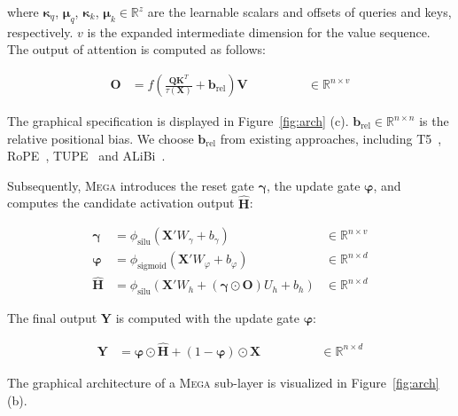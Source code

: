 where $\boldsymbol{\kappa}_q$, $\boldsymbol{\mu}_q$, $\boldsymbol{\kappa}_k$, $\boldsymbol{\mu}_k \in \mathbb{R}^{z}$ are the learnable scalars and offsets of queries and keys, respectively. $v$ is the expanded intermediate dimension for the value sequence. The output of attention is computed as follows:

\begin{align}\label{eq:attention2}
\boldsymbol{O} & = f \left(\frac{\boldsymbol{Q}{\boldsymbol{K}}^{T}}{\tau(\boldsymbol{X})} + \boldsymbol{b}_{\mathrm{rel}} \right) \boldsymbol{V} \quad & \quad \qquad \in \mathbb{R}^{n\times v}
\end{align}

The graphical specification is displayed in Figure~\ref{fig:arch} (c).
$\boldsymbol{b}_{\mathrm{rel}} \in \mathbb{R}^{n\times n}$ is the relative positional bias. We choose $\boldsymbol{b}_{\mathrm{rel}}$ from existing approaches, including T5~\citep{raffel2020exploring}, RoPE~\citep{su2021roformer}, TUPE~\citep{ke2020rethinking} and ALiBi~\citep{press2021train}. 

Subsequently, \textsc{Mega} introduces the reset gate $\boldsymbol{\gamma}$, the update gate $\boldsymbol{\varphi}$, and computes the candidate activation output $\boldsymbol{\hat{H}}$:

\begin{align}
\boldsymbol{\gamma} & = \phi_{\mathrm{silu}}(\boldsymbol{X}' W_\gamma + b_\gamma) & \in \mathbb{R}^{n\times v} \label{eq:reset} \\
\boldsymbol{\varphi} & = \phi_{\mathrm{sigmoid}}(\boldsymbol{X}' W_\varphi + b_\varphi) & \in \mathbb{R}^{n\times d} \label{eq:update} \\
\boldsymbol{\hat{H}} & = \phi_{\mathrm{silu}}(\boldsymbol{X}' W_h + (\boldsymbol{\gamma} \odot \boldsymbol{O}) U_{h} + b_h) & \in \mathbb{R}^{n\times d} \label{eq:candidate}
\end{align}

The final output $\boldsymbol{Y}$ is computed with the update gate $\boldsymbol{\varphi}$:

\begin{align}
\boldsymbol{Y} & = \boldsymbol{\varphi} \odot \boldsymbol{\hat{H}} + (1 - \boldsymbol{\varphi}) \odot \boldsymbol{X} \qquad & \qquad \in \mathbb{R}^{n\times d} \label{eq:output}
\end{align}

The graphical architecture of a \textsc{Mega} sub-layer is visualized in Figure~\ref{fig:arch} (b).


